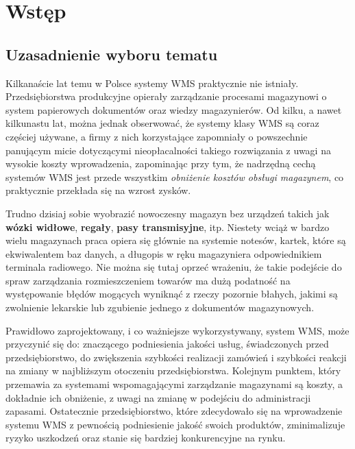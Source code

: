 \chapter{Wstęp}
\label{c1:c1}

\section{Uzasadnienie wyboru tematu}
	Kilkanaście lat temu w Polsce systemy WMS praktycznie nie istniały. Przedsiębiorstwa
	produkcyjne opierały zarządzanie procesami magazynowi o system papierowych dokumentów
	oraz wiedzy magazynierów. Od kilku, a nawet kilkunastu lat, można jednak obserwować, że
	systemy klasy WMS są coraz częściej używane, a firmy z nich korzystające zapomniały 
	o powszechnie panującym micie dotyczącymi nieopłacalności takiego rozwiązania z uwagi na wysokie 
	koszty wprowadzenia, zapominając przy tym, że nadrzędną cechą systemów WMS jest
	przede wszystkim \emph{obniżenie kosztów obsługi magazynem}, co praktycznie przekłada się na wzrost 
	zysków.
	
	Trudno dzisiaj sobie wyobrazić nowoczesny magazyn bez urządzeń takich jak \textbf{wózki widłowe}, 
	\textbf{regały}, \textbf{pasy transmisyjne}, itp. Niestety wciąż w bardzo wielu magazynach praca 
	opiera się głównie na systemie notesów, kartek, które 
	są ekwiwalentem baz danych, a długopis w ręku magazyniera odpowiednikiem terminala radiowego. Nie 
	można się tutaj oprzeć wrażeniu, że takie podejście do spraw zarządzania rozmieszczeniem towarów
	ma dużą podatność na występowanie błędów mogących wyniknąć z rzeczy pozornie błahych, jakimi są
	zwolnienie lekarskie lub zgubienie jednego z dokumentów magazynowych.
	
	Prawidłowo zaprojektowany, i co ważniejsze wykorzystywany, system WMS, może przyczynić się do:
	znaczącego podniesienia jakości usług, świadczonych przed przedsiębiorstwo, do zwiększenia
	szybkości realizacji zamówień i szybkości reakcji na zmiany w najbliższym otoczeniu
	przedsiębiorstwa. Kolejnym punktem, który przemawia za systemami wspomagającymi 
	zarządzanie magazynami są koszty, a dokładnie ich obniżenie, z uwagi na zmianę w podejściu 
	do administracji zapasami. Ostatecznie przedsiębiorstwo, które zdecydowało się na wprowadzenie
	systemu WMS z pewnością podniesienie jakość swoich produktów, zminimalizuje ryzyko
	uszkodzeń oraz stanie się bardziej konkurencyjne na rynku.	
